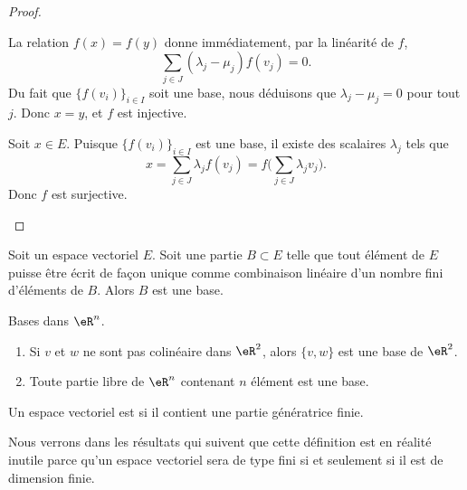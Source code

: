 \begin{proof}
\begin{subproof}
\begin{subproof}
			La relation \( f(x)=f(y)\) donne immédiatement, par la linéarité de \( f\),
			\begin{equation}
				\sum_{j\in J}(\lambda_j-\mu_j)f(v_j)=0.
			\end{equation}
			Du fait que \( \{ f(v_i) \}_{i\in I}\) soit une base, nous déduisons que \( \lambda_j-\mu_j=0\) pour tout \( j\). Donc \( x=y\), et \( f\) est injective.

			\spitem[Surjective]
			Soit \( x\in E\). Puisque \( \{ f(v_i) \}_{i\in I}\) est une base, il existe des scalaires \( \lambda_j\) tels que
			\begin{equation}
				x=\sum_{j\in J}\lambda_jf(v_j)=f\big( \sum_{j\in J}\lambda_jv_j \big).
			\end{equation}
			Donc \( f\) est surjective.
		\end{subproof}
	\end{subproof}
\end{proof}

\begin{proposition}	\label{PROPooVJFNooSbkzTF}
	Soit un espace vectoriel \( E\). Soit une partie \( B\subset E\) telle que tout élément de \( E\) puisse être écrit de façon unique comme combinaison linéaire d'un nombre fini d'éléments de \( B\). Alors \( B\) est une base.
\end{proposition}


\begin{lemma}        \label{LEMooRWQHooIxrQek}
	Bases dans \( \eR^n\).
	\begin{enumerate}
		\item       \label{ITEMooKWULooCTmOqM}
		      Si \( v\) et \( w\) ne sont pas colinéaire dans \( \eR^2\), alors \( \{ v,w \}\) est une base de \( \eR^2\).
		\item
		      Toute partie libre de \( \eR^n\) contenant \( n\) élément est une base.
	\end{enumerate}
\end{lemma}

\begin{definition}
	Un espace vectoriel est  si il contient une partie génératrice finie.
\end{definition}
Nous verrons dans les résultats qui suivent que cette définition est en réalité inutile parce qu'un espace vectoriel sera de type fini si et seulement si il est de dimension finie.

